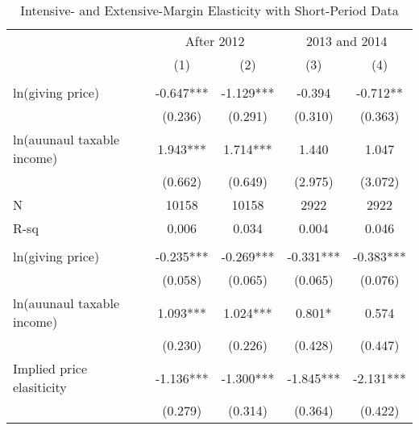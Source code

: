 \documentclass[ review  , 3p ]{elsarticle}
\begin{document}
  \begin{table}
  
  \caption{\label{tab:kableShortElasticity2}Intensive- and Extensive-Margin Elasticity with Short-Period Data}
  \centering
  \fontsize{8}{10}\selectfont
  \begin{threeparttable}
  \begin{tabular}[t]{lcccc}
  \toprule
  \multicolumn{1}{c}{ } & \multicolumn{2}{c}{After 2012} & \multicolumn{2}{c}{2013 and 2014} \\
  \cmidrule(l{3pt}r{3pt}){2-3} \cmidrule(l{3pt}r{3pt}){4-5}
   & (1) & (2) & (3) & (4)\\
  \midrule
  \addlinespace[0.3em]
  \multicolumn{5}{l}{\textbf{Intensive-Margin Elasticity}}\\
  \hspace{1em}ln(giving price) & -0.647*** & -1.129*** & -0.394 & -0.712**\\
  \hspace{1em} & (0.236) & (0.291) & (0.310) & (0.363)\\
  \hspace{1em}ln(auunaul taxable income) & 1.943*** & 1.714*** & 1.440 & 1.047\\
  \hspace{1em} & (0.662) & (0.649) & (2.975) & (3.072)\\
  \hspace{1em}N & 10158 & 10158 & 2922 & 2922\\
  \hspace{1em}R-sq & 0.006 & 0.034 & 0.004 & 0.046\\
  \addlinespace[0.3em]
  \multicolumn{5}{l}{\textbf{Extensive-Margin Elasticity}}\\
  \hspace{1em}ln(giving price) & -0.235*** & -0.269*** & -0.331*** & -0.383***\\
  \hspace{1em} & (0.058) & (0.065) & (0.065) & (0.076)\\
  \hspace{1em}ln(auunaul taxable income) & 1.093*** & 1.024*** & 0.801* & 0.574\\
  \hspace{1em} & (0.230) & (0.226) & (0.428) & (0.447)\\
  \hspace{1em}Implied price elasiticity & -1.136*** & -1.300*** & -1.845*** & -2.131***\\
  \hspace{1em} & (0.279) & (0.314) & (0.364) & (0.422)\\

\end{tabular}
\end{threeparttable}
\end{table}
\end{document}

